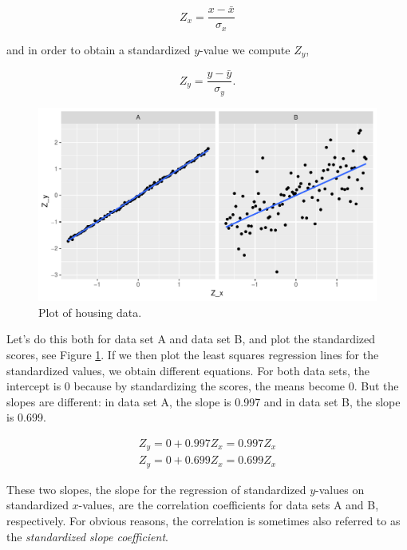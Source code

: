\documentclass[]{report}\usepackage[]{graphicx}\usepackage[]{color}
\makeatletter
\def\maxwidth{ %
  \ifdim\Gin@nat@width>\linewidth
    \linewidth
  \else
    \Gin@nat@width
  \fi
}
\newenvironment{knitrout}{}{} %
\makeatother
\begin{document}
\begin{equation}
Z_x = \frac{x- \bar{x}}{\sigma_x}
\end{equation}

and in order to obtain a standardized $y$-value we compute $Z_y$,

\begin{equation}
Z_y = \frac{y- \bar{y}}{\sigma_y}.
\end{equation}



\begin{knitrout}
\color{fgcolor}\begin{figure}

{\centering \includegraphics[width=\maxwidth]{figure/lm_19-1} 

}

\caption[Plot of housing data]{Plot of housing data.}\label{fig:lm_19}
\end{figure}


\end{knitrout}

Let's do this both for data set A and data set B, and plot the standardized scores, see Figure \ref{fig:lm_19}. If we then plot the least squares regression lines for the standardized values, we obtain different equations. For both data sets, the intercept is 0 because by standardizing the scores, the means become 0. But the slopes are different: in data set A, the slope is 0.997 and in data set B, the slope is 0.699.

\begin{eqnarray}
Z_y = 0 + 0.997Z_x=0.997Z_x \\
Z_y = 0 + 0.699Z_x=0.699Z_x
\end{eqnarray}


These two slopes, the slope for the regression of standardized $y$-values on standardized $x$-values, are the correlation coefficients for data sets A and B, respectively. For obvious reasons, the correlation is sometimes also referred to as the \textit{standardized slope coefficient}.
\end{document}
